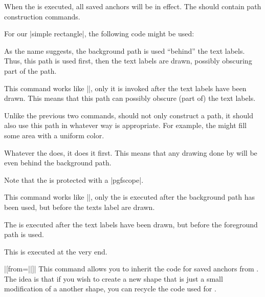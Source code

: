 \begin{command}{\pgfdeclareshape{}}
\begin{command}{\backgroundpath{}}
    When the  is executed, all saved anchors will be in
    effect. The  should contain path construction
    commands.

    For our |simple rectangle|, the following code might be used:
\begin{codeexample}
\end{codeexample}
    As the name suggests, the background path is used ``behind'' the
    text labels. Thus, this path is used first, then the text labels are
    drawn, possibly obscuring part of the path.
  \end{command}  
  \begin{command}{\foregroundpath{}}
    This command works like |\backgroundpath|, only it is invoked
    after the text labels have been drawn. This means that this path can
    possibly obscure (part of) the text labels.
  \end{command}  
  \begin{command}{\behindbackgroundpath{}}
    Unlike the previous two commands,  should not only
    construct a path, it should also use this path in whatever way is
    appropriate. For example, the  might fill some area
    with a uniform color.

    Whatever the  does, it does it first. This means that
    any drawing done by  will be even behind the background
    path.

    Note that the  is protected with a |{pgfscope}|.
  \end{command}  
  \begin{command}{\beforebackgroundpath{}}
    This command works like |\behindbackgroundpath|, only the
     is executed after the background path has been used,
    but before the texts label are drawn.
  \end{command}  
  \begin{command}{\behindforegroundpath{}}
    The  is executed after the text labels have been drawn,
    but before the foreground path is used.
  \end{command}  
  \begin{command}{\beforeforegroundpath{}}
    This  is executed at the very end.
  \end{command}  
  \begin{command}{\inheritsavedanchors|[from=||]|}
    This command allows you to inherit the code for saved anchors from
    . The idea is that if you wish to create
    a new shape that is just a small modification of a another shape,
    you can recycle the code used for .


\end{command}
\end{command}
